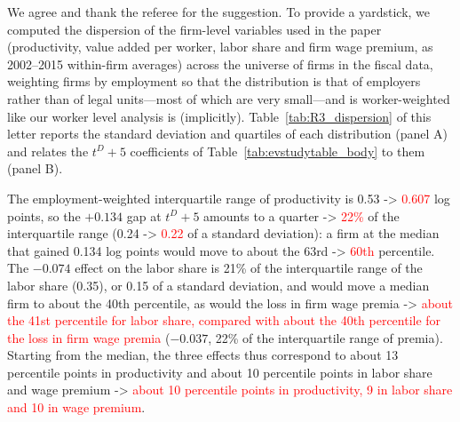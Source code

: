 \documentclass[11pt]{article}
\newcommand{\answer}[1]{\begingroup\color{navy}#1\endgroup}
\begin{document}
\begin{enumerate}[leftmargin=*]
\answer{We agree and thank the referee for the suggestion. To provide a yardstick, we computed the dispersion of the firm-level variables used in the paper (productivity, value added per worker, labor share and firm wage premium, as 2002--2015 within-firm averages) across the universe of firms in the fiscal data, weighting firms by employment so that the distribution is that of employers rather than of legal units---most of which are very small---and is worker-weighted like our worker level analysis is (implicitly). Table~\ref{tab:R3_dispersion} of this letter reports the standard deviation and quartiles of each distribution (panel A) and relates the $t^D+5$ coefficients of Table~\ref{tab:evstudytable_body} to them (panel B).

The employment-weighted interquartile range of productivity is 0.53 -> \textcolor{red}{0.607} log points, so the $+0.134$ gap at $t^D+5$ amounts to a quarter -> \textcolor{red}{22\%} of the interquartile range (0.24 -> \textcolor{red}{0.22} of a standard deviation): a firm at the median that gained 0.134 log points would move to about the 63rd -> \textcolor{red}{60th} percentile. The $-0.074$ effect on the labor share is 21\% of the interquartile range of the labor share (0.35), or 0.15 of a standard deviation, and would move a median firm to about the 40th percentile, as would the loss in firm wage premia -> \textcolor{red}{about the 41st percentile for labor share, compared with about the 40th percentile for the loss in firm wage premia} ($-0.037$, 22\% of the interquartile range of premia). Starting from the median, the three effects thus correspond to about 13 percentile points in productivity and about 10 percentile points in labor share and wage premium -> \textcolor{red}{about 10 percentile points in productivity, 9 in labor share and 10 in wage premium}.


}
\end{enumerate}
\end{document}
